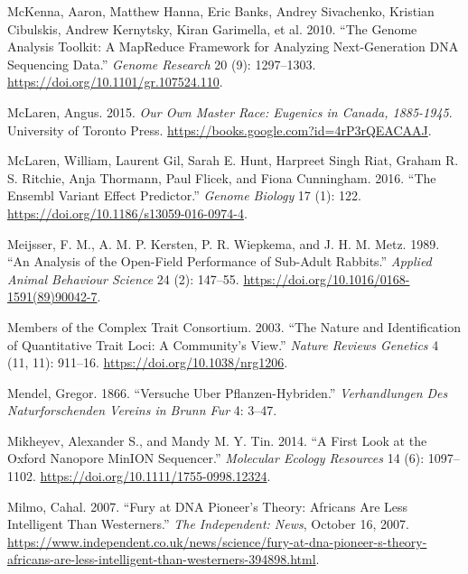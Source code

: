 \documentclass[
]{book}
\newlength{\cslhangindent}
\newlength{\cslentryspacingunit} %
\newenvironment{CSLReferences}[2] %
 {%
  \setlength{\parindent}{0pt}
  \ifodd #1
  \let\oldpar\par
  \def\par{\hangindent=\cslhangindent\oldpar}
  \fi
  \setlength{\parskip}{#2\cslentryspacingunit}
 }%
 {}
\begin{document}
\begin{CSLReferences}{1}{0}
\leavevmode{}%
McKenna, Aaron, Matthew Hanna, Eric Banks, Andrey Sivachenko, Kristian Cibulskis, Andrew Kernytsky, Kiran Garimella, et al. 2010. {``The {Genome Analysis Toolkit}: {A MapReduce} Framework for Analyzing Next-Generation {DNA} Sequencing Data.''} \emph{Genome Research} 20 (9): 1297--1303. \url{https://doi.org/10.1101/gr.107524.110}.

\leavevmode{}%
McLaren, Angus. 2015. \emph{Our {Own Master Race}: {Eugenics} in {Canada}, 1885-1945}. {University of Toronto Press}. \url{https://books.google.com?id=4rP3rQEACAAJ}.

\leavevmode{}%
McLaren, William, Laurent Gil, Sarah E. Hunt, Harpreet Singh Riat, Graham R. S. Ritchie, Anja Thormann, Paul Flicek, and Fiona Cunningham. 2016. {``The {Ensembl Variant Effect Predictor}.''} \emph{Genome Biology} 17 (1): 122. \url{https://doi.org/10.1186/s13059-016-0974-4}.

\leavevmode{}%
Meijsser, F. M., A. M. P. Kersten, P. R. Wiepkema, and J. H. M. Metz. 1989. {``An Analysis of the Open-Field Performance of Sub-Adult Rabbits.''} \emph{Applied Animal Behaviour Science} 24 (2): 147--55. \url{https://doi.org/10.1016/0168-1591(89)90042-7}.

\leavevmode{}%
Members of the Complex Trait Consortium. 2003. {``The Nature and Identification of Quantitative Trait Loci: A Community's View.''} \emph{Nature Reviews Genetics} 4 (11, 11): 911--16. \url{https://doi.org/10.1038/nrg1206}.

\leavevmode{}%
Mendel, Gregor. 1866. {``Versuche Uber Pflanzen-Hybriden.''} \emph{Verhandlungen Des Naturforschenden Vereins in Brunn Fur} 4: 3--47.

\leavevmode{}%
Mikheyev, Alexander S., and Mandy M. Y. Tin. 2014. {``A First Look at the {Oxford Nanopore MinION} Sequencer.''} \emph{Molecular Ecology Resources} 14 (6): 1097--1102. \url{https://doi.org/10.1111/1755-0998.12324}.

\leavevmode{}%
Milmo, Cahal. 2007. {``Fury at {DNA} Pioneer's Theory: {Africans} Are Less Intelligent Than {Westerners}.''} \emph{The Independent: News}, October 16, 2007. \url{https://www.independent.co.uk/news/science/fury-at-dna-pioneer-s-theory-africans-are-less-intelligent-than-westerners-394898.html}.


\end{CSLReferences}
\end{document}

